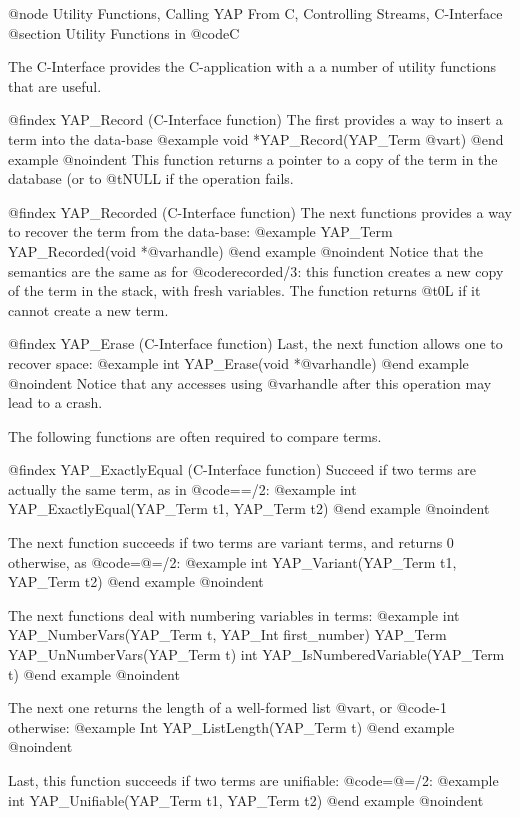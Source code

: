 {{{{{{{{@node Utility Functions, Calling YAP From C, Controlling Streams, C-Interface
@section Utility Functions in @code{C}


The C-Interface  provides the C-application with a a number of utility
functions that are useful.


@findex YAP_Record (C-Interface function)
The first provides a way to insert a term into the data-base
@example
      void      *YAP_Record(YAP_Term @var{t})
@end example
@noindent
This function returns a pointer to a copy of the term in the database
(or to @t{NULL} if the operation fails.

@findex YAP_Recorded (C-Interface function)
The next functions provides a way to recover the term from the data-base:
@example
      YAP_Term      YAP_Recorded(void *@var{handle})
@end example
@noindent
Notice that the semantics are the same as for @code{recorded/3}: this
function creates a new copy of the term in the stack, with fresh
variables. The function returns @t{0L} if it cannot create a new term.

@findex YAP_Erase (C-Interface function)
Last, the next function allows one to recover space:
@example
      int      YAP_Erase(void *@var{handle})
@end example
@noindent
Notice that any accesses using @var{handle} after this operation may
lead to a crash.

The following functions are often required to compare terms.

@findex YAP_ExactlyEqual (C-Interface function)
Succeed if two terms are actually the same term, as in
@code{==/2}:
@example
      int      YAP_ExactlyEqual(YAP_Term t1, YAP_Term t2)
@end example
@noindent

The next function succeeds if two terms are variant terms, and returns
0 otherwise, as
@code{=@=/2}:
@example
      int      YAP_Variant(YAP_Term t1, YAP_Term t2)
@end example
@noindent

The next functions deal with numbering variables in terms:
@example
      int      YAP_NumberVars(YAP_Term t, YAP_Int first_number)
      YAP_Term YAP_UnNumberVars(YAP_Term t)
      int      YAP_IsNumberedVariable(YAP_Term t)
@end example
@noindent

The next one returns the length of a well-formed list @var{t}, or
@code{-1} otherwise:
@example
      Int      YAP_ListLength(YAP_Term t)
@end example
@noindent


Last, this function succeeds if two terms are unifiable:
@code{=@=/2}:
@example
      int      YAP_Unifiable(YAP_Term t1, YAP_Term t2)
@end example
@noindent

}}}}}}}}
